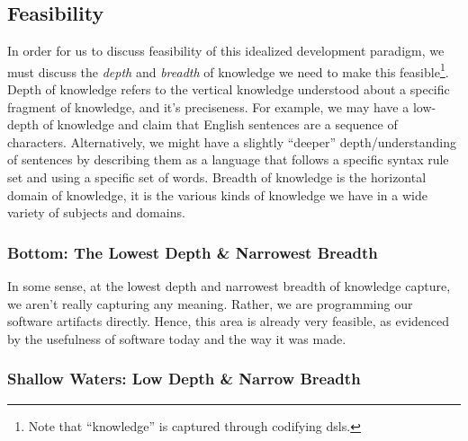 \subsection{Feasibility}
\label{chap:ideology:sec:thoughts_of_generation:subsec:feasibility}

In order for us to discuss feasibility of this idealized development paradigm,
we must discuss the \textit{depth} and \textit{breadth} of knowledge we need to
make this feasible\footnote{Note that ``knowledge'' is captured through
codifying \acsp{dsl}.}. Depth of knowledge refers to the vertical knowledge
understood about a specific fragment of knowledge, and it's preciseness. For
example, we may have a low-depth of knowledge and claim that English sentences
are a sequence of characters. Alternatively, we might have a slightly ``deeper''
depth/understanding  of sentences by describing them as a language that follows
a specific syntax rule set and using a specific set of words. Breadth of
knowledge is the horizontal domain of knowledge, it is the various kinds of
knowledge we have in a wide variety of subjects and domains.

\subsubsection{Bottom: The Lowest Depth \& Narrowest Breadth}
\label{chap:ideology:sec:thoughts_of_generation:subsec:feasibility:subsubsec:bottom}

In some sense, at the lowest depth and narrowest breadth of knowledge capture,
we aren't really capturing any meaning. Rather, we are programming our software
artifacts directly. Hence, this area is already very feasible, as evidenced by
the usefulness of software today and the way it was made.

\subsubsection{Shallow Waters: Low Depth \& Narrow Breadth}
\label{chap:ideology:sec:thoughts_of_generation:subsec:feasibility:subsubsec:low}

